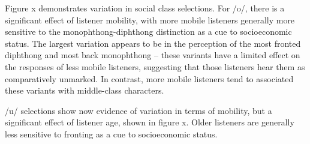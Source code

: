 \documentclass[PWPL]{article}
\begin{document}
Figure x demonstrates variation in social class selections. For /o/, there is a significant effect of listener mobility, with more mobile listeners generally more sensitive to the monophthong-diphthong distinction as a cue to socioeconomic status. The largest variation appears to be in the perception of the most fronted diphthong and most back monophthong -- these variants have a limited effect on the responses of less mobile listeners, suggesting that those listeners hear them as comparatively unmarked. In contrast, more mobile listeners tend to associated these variants with middle-class characters.

/u/ selections show now evidence of variation in terms of mobility, but a significant effect of listener age, shown in figure x. Older listeners are generally less sensitive to fronting as a cue to socioeconomic status.
\end{document}
